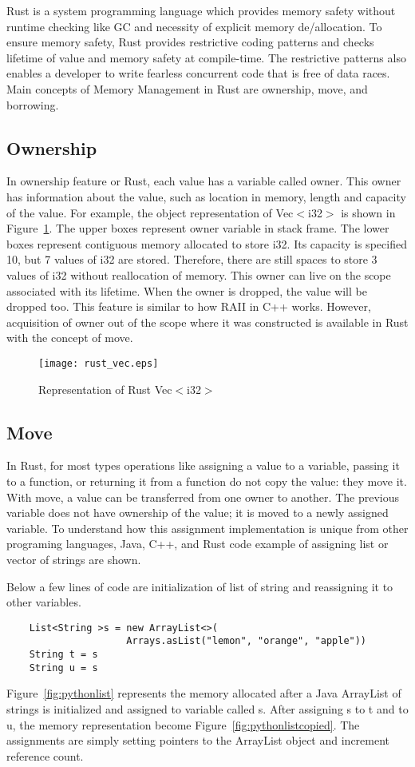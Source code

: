 
Rust is a system programming language which provides memory safety without runtime checking like GC and necessity of explicit memory de/allocation. 
To ensure memory safety, Rust provides restrictive coding patterns and checks lifetime of value and memory safety at compile-time.
The restrictive patterns also enables a developer to write fearless concurrent code that is free of data races.
Main concepts of Memory Management in Rust are ownership, move, and borrowing.

\subsection{Ownership}
In ownership feature or Rust, each value has a variable called owner.
This owner has information about the value, such as location in memory, length and capacity of the value. 
For example, the object representation of Vec$<$i32$>$ is shown in Figure~\ref{fig:rustvec}. The upper boxes represent owner variable in stack frame. 
The lower boxes represent contiguous memory allocated to store i32. Its capacity is specified 10, but 7 values of i32 are stored. 
Therefore, there are still spaces to store 3 values of i32 without reallocation of memory. This owner can live on the scope associated with its lifetime.
When the owner is dropped, the value will be dropped too. This feature is similar to how RAII in C++ works. 
However, acquisition of owner out of the scope where it was constructed is available in Rust with the concept of move. 

\begin{figure}[htb]
    \texttt{[image: rust\_vec.eps]}
    \caption{Representation of Rust Vec$<$i32$>$}
    \label{fig:rustvec}
\end{figure}


\subsection{Move}
In Rust, for most types operations like assigning a value to a variable, passing it to a function, or returning it from a function do not copy the value: they move it. 
With move, a value can be transferred from one owner to another. The previous variable does not have ownership of the value; it is moved to a newly assigned variable. 
To understand how this assignment implementation is unique from other programing languages, Java, C++, and Rust code example of assigning list or vector of strings are shown.

Below a few lines of code are initialization of list of string and reassigning it to other variables. 
\begin{lstlisting}
    List<String >s = new ArrayList<>(
                     Arrays.asList("lemon", "orange", "apple"))
    String t = s
    String u = s
 \end{lstlisting}
Figure~\ref{fig:pythonlist} represents the memory allocated after a Java ArrayList of strings is initialized and assigned to variable called s. After assigning s to t and to u, 
the memory representation become Figure~\ref{fig:pythonlistcopied}. The assignments are simply setting pointers to the ArrayList object and increment reference count. 

